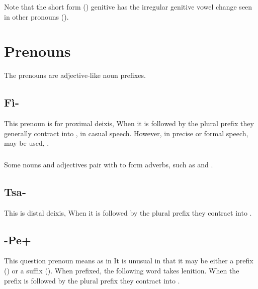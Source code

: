 \noindent Note that the short form () genitive has the
irregular genitive vowel change seen in other pronouns
().

\section{Prenouns}

\noindent The prenouns are adjective-like noun prefixes. 

\subsection{Fì-} This prenoun is for proximal deixis,   When
it is followed by the plural prefix  they generally contract
into ,  in casual speech.  However, in precise or
formal speech,  may be used, . \label{morph:prenoun:fi}
 

\subsubsection{} Some nouns and adjectives pair with  to form
adverbs, such as   and  .

\subsection{Tsa-} This is distal deixis,   When it is
followed by the plural prefix  they contract into 
. 
 

\subsection{-Pe+} \label{morph:pre:pe} This question prenoun means
 as in    It is unusual in
that it may be either a prefix () or a suffix ().
When prefixed, the following word takes lenition.  When the prefix is
followed by the plural prefix  they contract into .

